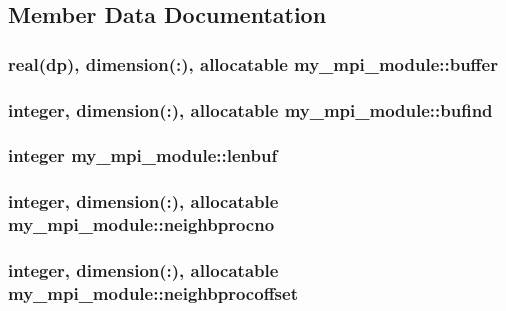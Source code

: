\subsection{Member Data Documentation}
\hypertarget{classmy__mpi__module_a04f467db36199e98b0dfc5c72a2f993d}{
\subsubsection[{buffer}]{\setlength{\rightskip}{0pt plus 5cm}real(dp), dimension(\-:), allocatable my\-\_\-mpi\-\_\-module\-::buffer}}\label{classmy__mpi__module_a04f467db36199e98b0dfc5c72a2f993d}
\hypertarget{classmy__mpi__module_a5ece5549dad644d94619ce1566b5bbba}{
\subsubsection[{bufind}]{\setlength{\rightskip}{0pt plus 5cm}integer, dimension(\-:), allocatable my\-\_\-mpi\-\_\-module\-::bufind}}\label{classmy__mpi__module_a5ece5549dad644d94619ce1566b5bbba}
\hypertarget{classmy__mpi__module_a82789d56a363b94cd7f592ceefb6ad0c}{
\subsubsection[{lenbuf}]{\setlength{\rightskip}{0pt plus 5cm}integer my\-\_\-mpi\-\_\-module\-::lenbuf}}\label{classmy__mpi__module_a82789d56a363b94cd7f592ceefb6ad0c}
\hypertarget{classmy__mpi__module_af8e0702b35db91cc77e087d3343abbf2}{
\subsubsection[{neighbprocno}]{\setlength{\rightskip}{0pt plus 5cm}integer, dimension(\-:), allocatable my\-\_\-mpi\-\_\-module\-::neighbprocno}}\label{classmy__mpi__module_af8e0702b35db91cc77e087d3343abbf2}
\hypertarget{classmy__mpi__module_ac50725ae6d52207dc965ada7e693ad7c}{
\subsubsection[{neighbprocoffset}]{\setlength{\rightskip}{0pt plus 5cm}integer, dimension(\-:), allocatable my\-\_\-mpi\-\_\-module\-::neighbprocoffset}}\label{classmy__mpi__module_ac50725ae6d52207dc965ada7e693ad7c}

